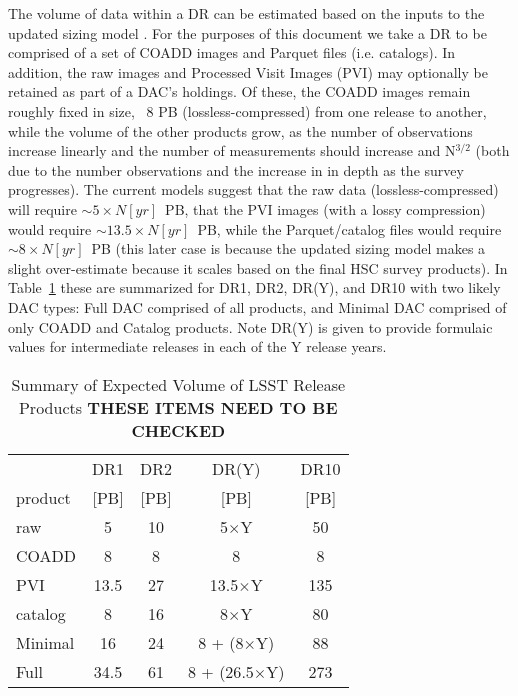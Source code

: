 The volume of data within a DR can be estimated based on the inputs to the updated sizing model .  
For the purposes of this document we take a DR to be comprised of a set of COADD images and Parquet files (i.e. catalogs).  
In addition, the raw images and Processed Visit Images (PVI) may optionally be retained as part of a DAC's holdings.  
Of these, the COADD images remain roughly fixed in size, ~8 PB (lossless-compressed) from one release to another,
while the volume of the other products grow, as the number of observations increase linearly and the number of measurements 
should increase and N$^{3/2}$ (both due to the number observations and the increase in in depth as the survey progresses).  
The current models suggest that the raw data (lossless-compressed) will require $\sim 5\times N[yr]$~PB, that the PVI 
images (with a lossy compression) would require $\sim 13.5\times N[yr]$~PB, while the Parquet/catalog files would 
require $\sim 8\times N[yr]$~PB (this later case is because the updated sizing model makes a slight over-estimate 
because it scales based on the final HSC survey products).  In Table~\ref{tab_volume} these are summarized for DR1, DR2, 
DR(Y), and DR10 with two likely DAC types: Full DAC comprised of all products, and Minimal DAC comprised of only COADD 
and Catalog products.  Note DR(Y) is given to provide formulaic values for intermediate releases in each of the Y release years.

\begin{table}[!ht]
\caption{Summary of Expected Volume of LSST Release Products {\bf THESE ITEMS NEED TO BE CHECKED }}
\label{tab_volume}
\footnotesize
\centering
\begin{tabular}[]{|l|cccc|}
\hline
\hline
            &   DR1  &  DR2   &  DR(Y)  &  DR10 \\
 product    &  [PB]  &  [PB]  &  [PB]   &  [PB] \\
\hline
 raw        &    5   &   10   &  5$\times$Y    &   50   \\
 COADD      &    8   &    8   &    8           &    8   \\
 PVI        &  13.5  &   27   &  13.5$\times$Y  &  135   \\
 catalog    &    8   &   16   &  8$\times$Y    &   80   \\
\hline
 Minimal    &   16   &   24   &  8 + (8$\times$Y) &   88   \\
 Full       &  34.5  &   61   &  8 + (26.5$\times$Y) &  273   \\
\hline
\end{tabular}
\end{table}

